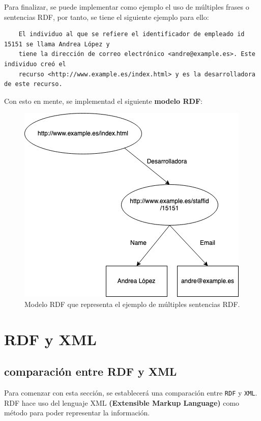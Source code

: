 \documentclass[11pt]{report}
\begin{document}
Para finalizar, se puede implementar como ejemplo el uso de múltiples frases o sentencias RDF, por tanto, se tiene el siguiente ejemplo para ello:

\begin{verbatim}
	El individuo al que se refiere el identificador de empleado id 15151 se llama Andrea López y 
	tiene la dirección de correo electrónico <andre@example.es>. Este individuo creó el 
	recurso <http://www.example.es/index.html> y es la desarrolladora de este recurso.
\end{verbatim}

Con esto en mente, se implementad el siguiente \textbf{modelo RDF}:

\begin{figure}[H]
	\centering
	\includegraphics[scale=0.7]{../img/Modelo-RDF.png}
	\caption{Modelo RDF que representa el ejemplo de múltiples sentencias RDF.}
	\label{fig:Modelo-RDF}
\end{figure}

\chapter{RDF y XML}

\section{comparación entre RDF y XML}

Para comenzar con esta sección,  se establecerá una comparación entre \texttt{RDF} y \texttt{XML}. RDF hace uso del lenguaje XML \textbf{(Extensible Markup Language)} como método para poder representar la información.
\end{document}
